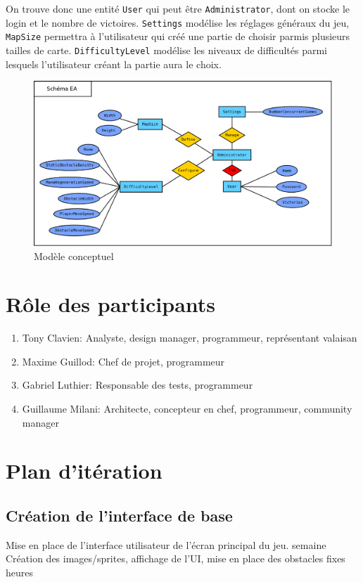 \documentclass[a4paper,11pt]{article}
\begin{document}
	On trouve donc une entité \texttt{User} qui peut être \texttt{Administrator}, dont on stocke le login et le nombre de victoires. \texttt{Settings} modélise les réglages généraux du jeu, \texttt{MapSize} permettra à l'utilisateur qui créé une partie de choisir parmis plusieurs tailles de carte. \texttt{DifficultyLevel} modélise les niveaux de difficultés parmi lesquels l'utilisateur créant la partie aura le choix.
	\begin{figure}[ht]
		\centering
		\includegraphics[width=\textwidth]{../Database/ER_diagram.png}
		\caption{Modèle conceptuel}
		\label{database_er}
	\end{figure}

	\section{Rôle des participants}
		\begin{enumerate}
			\item Tony Clavien: Analyste, design manager, programmeur, représentant valaisan
			\item Maxime Guillod: Chef de projet, programmeur
			\item Gabriel Luthier: Responsable des tests, programmeur
			\item Guillaume Milani: Architecte, concepteur en chef, programmeur, community manager
		\end{enumerate}

	\newpage
	\section{Plan d'itération}

		\subsection{Création de l'interface de base}
			\begin{enumerate}[labelwidth=5em,leftmargin=8em]
				\objectif Mise en place de l'interface utilisateur de l'écran principal du jeu.
				 semaine
				\partageTache Création des images/sprites, affichage de l'UI, mise en place des obstacles fixes
				 heures
			\end{enumerate}
\end{document}
